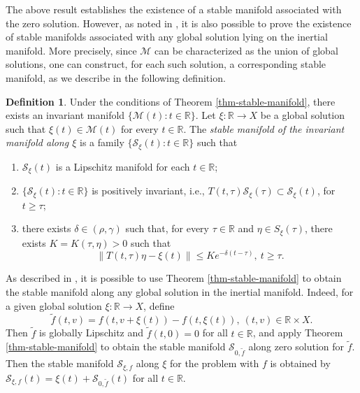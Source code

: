 \documentclass[a4paper,11pt,reqno]{amsart}
\theoremstyle{plain}
\theoremstyle{definition}
\newtheorem{defn}[lem]{Definition}
\numberwithin{equation}{section}
\newcommand{\R}{\mathbb{R}}
\renewcommand{\geq}{\geqslant}
\renewcommand{\leq}{\leqslant}
\begin{document}
The above result establishes the existence of a stable manifold associated with the zero solution. However, as noted in \cite{CLMO-S25}, it is also possible to prove the existence of stable manifolds associated with any global solution lying on the inertial manifold. More precisely, since $\mathcal{M}$ can be characterized as the union of global solutions, one can construct, for each such solution, a corresponding stable manifold, as we describe in the following definition.

\begin{defn} 
Under the conditions of Theorem  \ref{thm-stable-manifold}, there exists an invariant manifold $\{\mathcal{M}(t)\colon t\in\R\}$. 
Let $\xi\colon\R\to X$ be a global solution such that  
$\xi(t)\in \mathcal{M}(t)$ for every $t\in \R$.
The \emph{stable manifold of the invariant manifold along $\xi$} is a family $\{\mathcal{S}_\xi(t)\colon t\in\R\}$ such that 
	\begin{enumerate}
		\item $\mathcal{S}_\xi(t)$ is a Lipschitz manifold for each $t\in \mathbb{R}$;
		\item $\{\mathcal{S}_\xi(t)\colon t\in \mathbb{R}\}$ is positively invariant, i.e., $T(t,\tau)\mathcal{S}_\xi(\tau)\subset \mathcal{S}_\xi(t)$, for $t\geq \tau$;
		\item there exists $\delta\in (\rho,\gamma)$ such that, for every $\tau \in \R$ and $\eta \in S_\xi(\tau)$, there exists $K = K(\tau, \eta) > 0$ such that
  $$\|T(t,\tau) \eta-\xi(t)\|\leq Ke^{-\delta(t-\tau)}, \ t\geq \tau .$$ 
\end{enumerate}
\end{defn}

As described in \cite[Remark 2.4]{CLMO-S25}, it is possible to use Theorem \ref{thm-stable-manifold} to obtain the stable manifold along any global solution in the inertial manifold. 
Indeed, for a given global solution $\xi\colon\R\to X$, define 
$$\tilde{f}(t,v)=f(t,v+\xi(t))-f(t,\xi(t)), \ (t,v)\in \R\times X.$$
Then $\tilde{f}$ is globally Lipschitz and $\tilde{f}(t,0)=0$ for all $t\in \R$, and apply Theorem \ref{thm-stable-manifold} to obtain the stable manifold $\mathcal{S}_{0,\tilde{f}}$ along zero solution for $\tilde{f}$. 
Then the stable manifold $\mathcal{S}_{\xi,f}$ along $\xi$ for the problem with $f$ is obtained by $\mathcal{S}_{\xi,f}(t)=\xi(t)+\mathcal{S}_{0,\tilde{f}}(t)$ for all $t\in \R$.
\end{document}
